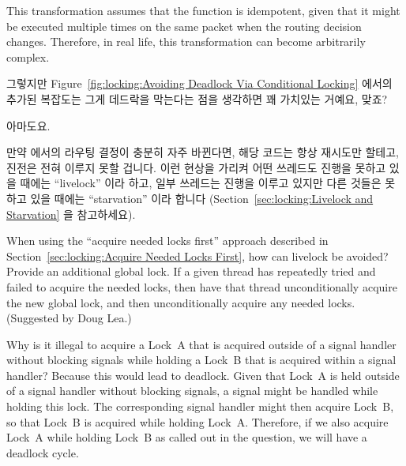 \begin{enumerate}
	This transformation assumes that the
	 function is idempotent, given that
	it might be executed multiple times on the same packet when
	the  routing decision changes.
	Therefore, in real life, this transformation can become
	arbitrarily complex.
	\fi

\QuickQ{}
	그렇지만
	Figure~\ref{fig:locking:Avoiding Deadlock Via Conditional Locking}
	에서의 추가된 복잡도는 그게 데드락을 막는다는 점을 생각하면 꽤 가치있는
	거예요, 맞죠?

\QuickA{}
	아마도요.

	만약  에서의 라우팅 결정이 충분히 자주 바뀐다면, 해당
	코드는 항상 재시도만 할테고, 진전은 전혀 이루지 못할 겁니다.
	이런 현상을 가리켜 어떤 쓰레드도 진행을 못하고 있을 때에는 ``livelock''
	이라 하고, 일부 쓰레드는 진행을 이루고 있지만 다른 것들은 못하고 있을
	때에는 ``starvation'' 이라 합니다 (Section~\ref{sec:locking:Livelock
	and Starvation} 을 참고하세요).

\QuickQ{}
	When using the ``acquire needed locks first'' approach described in
	Section~\ref{sec:locking:Acquire Needed Locks First},
	how can livelock be avoided?
\QuickA{}
	Provide an additional global lock.
	If a given thread has repeatedly tried and failed to acquire the needed
	locks, then have that thread unconditionally acquire the new
	global lock, and then unconditionally acquire any needed locks.
	(Suggested by Doug Lea.)

\QuickQ{}
	Why is it illegal to acquire a Lock~A that is acquired outside
	of a signal handler without blocking signals while holding
	a Lock~B that is acquired within a signal handler?
\QuickA{}
	Because this would lead to deadlock.
	Given that Lock~A is held outside of a signal
	handler without blocking signals, a signal might be handled while
	holding this lock.
	The corresponding signal handler might then acquire
	Lock~B, so that Lock~B is acquired while holding Lock~A.
	Therefore, if we also acquire Lock~A while holding Lock~B
	as called out in the question, we will have a deadlock cycle.


\end{enumerate}
